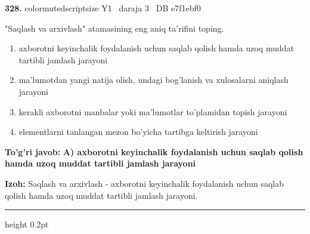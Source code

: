 \documentclass[10pt,a4paper,oneside]{article}
\begin{document}
\noindent\textbf{\color{ink}328.}  {color{muted}scriptsize Y1 \textbullet\ daraja 3 \textbullet\ DB e7f1ebf0}
\par
"Saqlash va arxivlash" atamasining eng aniq ta'rifini toping.
\begin{enumerate}[label=\Alph*),leftmargin=9mm]
\item axborotni keyinchalik foydalanish uchun saqlab qolish hamda uzoq muddat tartibli jamlash jarayoni
\item ma'lumotdan yangi natija olish, undagi bog'lanish va xulosalarni aniqlash jarayoni
\item kerakli axborotni manbalar yoki ma'lumotlar to'plamidan topish jarayoni
\item elementlarni tanlangan mezon bo'yicha tartibga keltirish jarayoni
\end{enumerate}
\begin{tcolorbox}[enhanced,breakable,colback=teal!4,colframe=teal!50!black,boxrule=0.5pt,arc=1.1mm,left=3mm,right=3mm,top=1.7mm,bottom=1.7mm,before skip=2mm,after skip=2mm]
\textbf{\color{teal}To'g'ri javob:} \textbf{A) axborotni keyinchalik foydalanish uchun saqlab qolish hamda uzoq muddat tartibli jamlash jarayoni}
\par\smallskip
\textbf{Izoh:} Saqlash va arxivlash - axborotni keyinchalik foydalanish uchun saqlab qolish hamda uzoq muddat tartibli jamlash jarayoni.
\end{tcolorbox}
\vspace{2mm}\hrule height 0.2pt \vspace{3mm}
\end{document}

